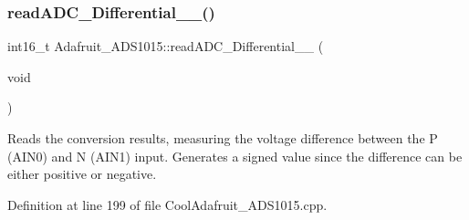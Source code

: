\subsubsection{\texorpdfstring{read\+A\+D\+C\+\_\+\+Differential\+\_\+\_()}{readADC\_Differential\_0\_1()}}
{\footnotesize\ttfamily int16\+\_\+t Adafruit\+\_\+\+A\+D\+S1015\+::read\+A\+D\+C\+\_\+\+Differential\+\_\+\_ (\begin{DoxyParamCaption}\item[{void}]{ }\end{DoxyParamCaption})}



Reads the conversion results, measuring the voltage difference between the P (A\+I\+N0) and N (A\+I\+N1) input. Generates a signed value since the difference can be either positive or negative. 



Definition at line 199 of file Cool\+Adafruit\+\_\+\+A\+D\+S1015.\+cpp.


